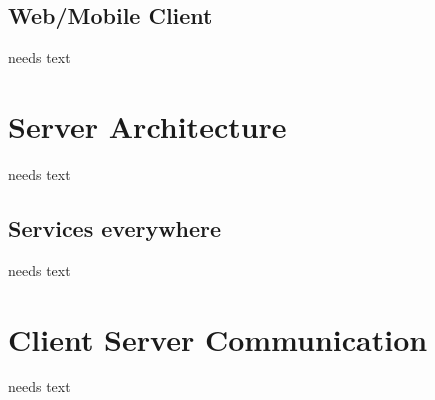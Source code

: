 \documentclass[a4paper,10pt,twoside]{book}
\begin{document}
\subsection{Web/Mobile Client}
needs text
  
\section{Server Architecture}
needs text

\subsection{Services everywhere}
needs text

\section{Client Server Communication}
needs text
  

\ifx\wholebook\relax\else
   
   
\end{document}

